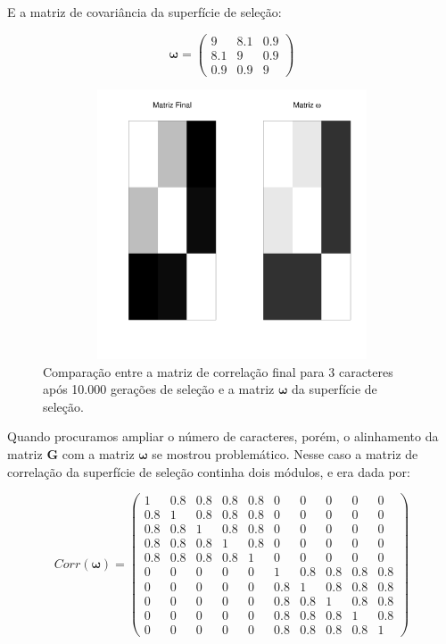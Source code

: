 E a matriz de covariância da superfície de seleção: 

\begin{equation}
    \pmb{\omega} = \left( \begin{smallmatrix} 9 & 8.1 & 0.9\\  8.1 & 9 & 0.9 \\ 0.9 & 0.9 & 9 \end{smallmatrix}  \right)
\end{equation}

\begin{figure}[htbp]
    \centering
    \includegraphics[width=150mm, height=80mm]{figuras/Mat3tracos}
    \caption{Comparação entre a matriz de correlação final para 3
        caracteres após 10.000 gerações de seleção e a matriz
        $\pmb{\omega}$ da superfície de seleção.}
    \label{MatJones3tracos}
\end{figure}

Quando procuramos ampliar o número de caracteres, porém, o alinhamento da
matriz $\mathbf{G}$ com a matriz $\pmb{\omega}$ se mostrou problemático.
Nesse caso a matriz de correlação da superfície de seleção continha dois
módulos, e era dada por:

\begin{equation}
    Corr(\pmb{\omega}) = \left( 
    \begin{smallmatrix} 
        1 & 0.8 & 0.8 & 0.8 & 0.8 & 0 & 0 & 0 & 0 & 0\\  
      0.8 & 1 & 0.8 & 0.8 & 0.8 & 0 & 0 & 0 & 0 & 0\\  
      0.8 & 0.8 & 1 & 0.8 & 0.8 & 0 & 0 & 0 & 0 & 0\\  
      0.8 & 0.8 & 0.8 & 1 & 0.8 & 0 & 0 & 0 & 0 & 0\\  
      0.8 & 0.8 & 0.8 & 0.8 & 1 & 0 & 0 & 0 & 0 & 0\\  
        0 & 0 & 0 & 0 & 0 & 1 & 0.8 & 0.8 & 0.8 & 0.8\\ 
        0 & 0 & 0 & 0 & 0 & 0.8 & 1 & 0.8 & 0.8 & 0.8\\
        0 & 0 & 0 & 0 & 0 & 0.8 & 0.8 & 1 & 0.8 & 0.8\\
        0 & 0 & 0 & 0 & 0 & 0.8 & 0.8 & 0.8 & 1 & 0.8\\
        0 & 0 & 0 & 0 & 0 & 0.8 & 0.8 & 0.8 & 0.8 & 1
    \end{smallmatrix}  \right)
    \label{matw}
\end{equation}

